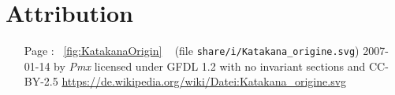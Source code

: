 \chapter{Attribution}
\label{chap:attribution}

\begin{itemize}

        \item[Page \pageref{fig:KatakanaOrigin}:] ~\ref{fig:KatakanaOrigin}
                ~ (file
                \texttt{share/i/Katakana\_origine.svg}) 2007-01-14 by
                \textit{Pmx} licensed under GFDL 1.2 with no invariant sections
                and CC-BY-2.5
                \url{https://de.wikipedia.org/wiki/Datei:Katakana_origine.svg}


\end{itemize}




